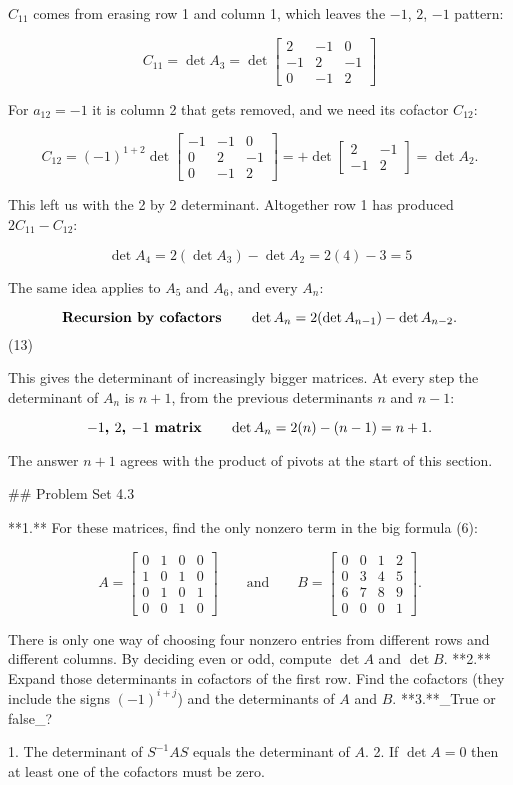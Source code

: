\(C_{11}\) comes from erasing row 1 and column 1, which leaves the \(-1\), \(2\), \(-1\) pattern:

\[C_{11}=\det A_{3}=\det\left[\begin{matrix}2&-1&0\\ -1&2&-1\\ 0&-1&2\end{matrix}\right]\]

For \(a_{12}=-1\) it is column 2 that gets removed, and we need its cofactor \(C_{12}\):

\[C_{12}=(-1)^{1+2}\det\left[\begin{matrix}-1&-1&0\\ 0&2&-1\\ 0&-1&2\end{matrix}\right]=+\det\left[\begin{matrix}2&-1\\ -1&2\end{matrix}\right]=\det A_{2}.\]

This left us with the 2 by 2 determinant. Altogether row 1 has produced \(2C_{11}-C_{12}\):

\[\det A_{4}=2(\det A_{3})-\det A_{2}=2(4)-3=5\]

The same idea applies to \(A_{5}\) and \(A_{6}\), and every \(A_{n}\):

\[\text{\bf Recursion by cofactors}\qquad\det A_{n}=2(\det A_{n-1})-\det A_{n-2}.\] (13)

This gives the determinant of increasingly bigger matrices. At every step the determinant of \(A_{n}\) is \(n+1\), from the previous determinants \(n\) and \(n-1\):

\[\text{\bf$-1$, $2$, $-1$ matrix}\qquad\det A_{n}=2(n)-(n-1)=n+1.\]

The answer \(n+1\) agrees with the product of pivots at the start of this section.

## Problem Set 4.3

**1.** For these matrices, find the only nonzero term in the big formula (6):

\[A=\left[\begin{matrix}0&1&0&0\\ 1&0&1&0\\ 0&1&0&1\\ 0&0&1&0\end{matrix}\right]\qquad\text{and}\qquad B=\left[\begin{matrix}0&0&1&2 \\ 0&3&4&5\\ 6&7&8&9\\ 0&0&0&1\end{matrix}\right].\]

There is only one way of choosing four nonzero entries from different rows and different columns. By deciding even or odd, compute \(\det A\) and \(\det B\).
**2.** Expand those determinants in cofactors of the first row. Find the cofactors (they include the signs \((-1)^{i+j}\)) and the determinants of \(A\) and \(B\).
**3.**_True or false_?

1. The determinant of \(S^{-1}AS\) equals the determinant of \(A\). 2. If \(\det A=0\) then at least one of the cofactors must be zero.

 